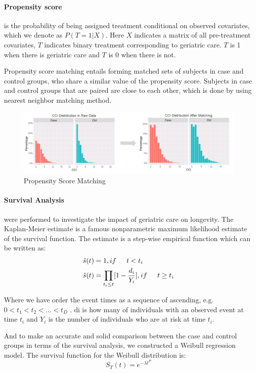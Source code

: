 \documentclass{article}
\begin{document}
	\paragraph{Propensity score}is the probability of being assigned treatment conditional on observed covariates, which we denote as $P(T=1|X)$. Here $X$ indicates a matrix of all pre-treatment covariates, $T$ indicates binary treatment corresponding to geriatric care. $T$ is 1 when there is geriatric care and $T$ is 0 when there is not. 
	
	Propensity score matching entails forming matched sets of subjects in case and control groups, who share a similar value of the propensity score. Subjects in case and control groups that are paired are close to each other, which is done by using nearest neighbor matching method.
	
	\begin{figure}[h]
		\centering
		\includegraphics[width=1\textwidth]{TrinityPSM}
		\caption{Propensity Score Matching}
	\end{figure}


	\paragraph{Survival Analysis} were performed to investigate the impact of geriatric care on longevity. The Kaplan-Meier estimate is a famous nonparametric maximum likelihood estimate of the survival function. The estimate is a step-wise empirical function which can be written as:
	\begin{align*}
	\hat{s}(t) &= 1, if \indent t < t_i\\
	\hat{s}(t) &= \prod_{t_i\le t}[1 - \frac{d_i}{Y_i}], if \indent t \ge t_i
	\end{align*} 
	
	Where we have order the event times as a sequence of ascending, e.g. $0 < t_1 < t_2 < ... < t_D$ . di is how many of individuals with an observed event at time $t_i$ and $Y_i$ is the number of individuals who are at risk at time $t_i$.
	
	And to make an accurate and solid comparison between the case and control groups in terms of the survival analysis, we constructed a Weibull regression model. The survival function for the Weibull distribution is:
	$$S_T(t) = e^{-\lambda t^P} $$
	
\end{document}
